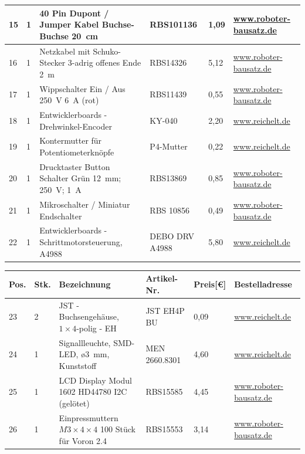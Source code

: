 \begin{center}
\begin{tabularx}{\textwidth}{|p{0.4cm}|p{0.4cm}|X|X|p{1cm}|X|}
		\hline
		15 & 1 & 40 Pin Dupont / Jumper Kabel Buchse-Buchse 20\ cm & RBS101136 & 1,09 & \href{https://www.roboter-bausatz.de/p/40-pin-dupont-jumper-kabel-buchse-buchse-20-cm}{www.roboter-bausatz.de} \\
		\hline
		16 & 1 & Netzkabel mit Schuko-Stecker 3-adrig offenes Ende 2\ m & RBS14326 & 5,12 & \href{https://www.roboter-bausatz.de/p/netzkabel-mit-schuko-stecker-3-adrig-offenes-ende-2m}{www.roboter-bausatz.de} \\
		\hline
		17 & 1 & Wippschalter Ein / Aus 250\ V 6\ A (rot) & RBS11439 & 0,55 & \href{https://www.roboter-bausatz.de/p/wippschalter-ein-aus-250v-6a-rot}{www.roboter-bausatz.de} \\
		\hline
		18 & 1 & Entwicklerboards - Drehwinkel-Encoder & KY-040 & 2,20 & \href{www.reichelt.de}{www.reichelt.de} \\
		\hline
		19 & 1 & Kontermutter für Potentiometerknöpfe & P4-Mutter & 0,22 & \href{www.reichelt.de}{www.reichelt.de} \\
		\hline
		20 & 1 & Drucktaster Button Schalter Grün 12\ mm; 250\ V; 1\ A  & RBS13869 & 0,85 & \href{https://www.roboter-bausatz.de/p/drucktaster-button-schalter-gruen-12mm-250v-1a}{www.roboter-bausatz.de} \\
		\hline
		21 & 1 & Mikroschalter / Miniatur Endschalter & RBS 10856 & 0,49 & \href{https://www.roboter-bausatz.de/p/mikroschalter-miniatur-endschalter}{www.roboter-bausatz.de} \\
		\hline
		22 & 1 & Entwicklerboards - Schrittmotorsteuerung, A4988 & DEBO DRV A4988 & 5,80 & \href{https://wwww.reichelt.de}{www.reichelt.de} \\
		\hline
	\end{tabularx}
	\newpage
	\fontsize{8}{10}\selectfont
	\begin{tabularx}{\textwidth}{|p{0.4cm}|p{0.4cm}|X|X|p{1cm}|X|}
		\hline 
		\textbf{Pos.} & \textbf{Stk.} & \textbf{Bezeichnung} & \textbf{Artikel-Nr.} & \textbf{Preis[€]} & \textbf{Bestelladresse} \\ \hline
		23 & 2 & JST - Buchsengehäuse, $1 \times 4$-polig - EH & JST EH4P BU & 0,09 & \href{https://wwww.reichelt.de}{www.reichelt.de} \\
		\hline
		24 & 1 & Signallleuchte, SMD-LED, ø3\ mm, Kunststoff & MEN 2660.8301 & 4,60 & \href{https://wwww.reichelt.de}{www.reichelt.de} \\
		\hline
		25 & 1 & LCD Display Modul 1602 HD44780 I2C (gelötet) & RBS15585 & 4,45 & \href{https://www.roboter-bausatz.de/p/lcd-display-modul-1602-hd44780-i2c-geloetet}{www.roboter-bausatz.de} \\
		\hline
		26 & 1 & Einpressmuttern $M3\times 4 \times 4$ 100 Stück für Voron 2.4 & RBS15553 & 3,14 & \href{https://www.roboter-bausatz.de/p/einpressmuttern-m3x4x4-100-stueck-fuer-voron-2.4}{www.roboter-bausatz.de} \\
		\hline
	\end{tabularx}
	
\end{center}

